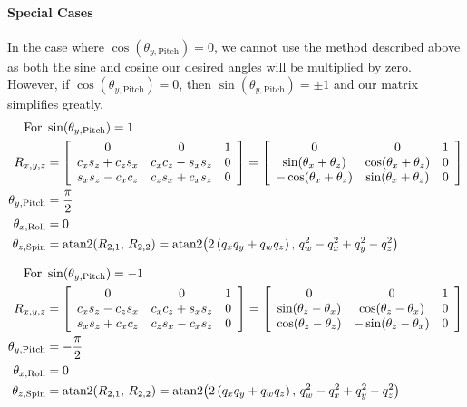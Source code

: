 \documentclass[letterpaper,10pt]{article}
\begin{document}
\paragraph{Special Cases}
In the case where $\cos\!\left(\theta_{y,\text{Pitch}}\right) = 0$, we cannot use the method described above as both the sine and cosine our desired angles will be multiplied by zero. However, if $\cos\!\left(\theta_{y,\text{Pitch}}\right) = 0$, then $\sin\!\left(\theta_{y,\text{Pitch}}\right) = \pm1$ and our matrix simplifies greatly.
\begin{align}
\nonumber \text{For } & \sin\!\left(\theta_{y,\text{Pitch}}\right) = 1 \\
R_{x,y,z} &= \left[\begin{array}{c c c} 0 & 0 & 1 \\ c_x s_z + c_z s_x & c_x c_z - s_x s_z & 0 \\ s_x s_z - c_x c_z & c_z s_x + c_x s_z & 0\end{array} \right] = \left[\begin{array}{c c c} 0 & 0 & 1 \\ \sin\!\left(\theta_x + \theta_z\right) & \cos\!\left(\theta_x + \theta_z\right) & 0 \\ -\cos\!\left(\theta_x + \theta_z\right) & \sin\!\left(\theta_x + \theta_z\right) & 0\end{array} \right] \\
\theta_{y,\text{Pitch}} &= \dfrac{\pi}{2} \\
\theta_{x,\text{Roll}} &= 0 \\
\theta_{z,\text{Spin}} &= \mathrm{atan2}\!\left(R_{2,1}, \, R_{2,2}\right) = \mathrm{atan2}\!\left(2\left(q_x q_y + q_w q_z\right), \, q_w^2 - q_x^2 + q_y^2 - q_z^2 \right)
\end{align}

\begin{align}
\nonumber \text{For } & \sin\!\left(\theta_{y,\text{Pitch}}\right) = -1 \\
R_{x,y,z} &= \left[\begin{array}{c c c} 0 & 0 & 1 \\ c_x s_z - c_z s_x & c_x c_z + s_x s_z & 0 \\ s_x s_z + c_x c_z & c_z s_x - c_x s_z & 0\end{array} \right] = \left[\begin{array}{c c c} 0 & 0 & 1 \\ \sin\!\left(\theta_z - \theta_x\right) & \cos\!\left(\theta_z - \theta_x\right) & 0\\ \cos\!\left(\theta_z - \theta_z\right) & -\sin\!\left(\theta_z - \theta_x\right) & 0\end{array} \right] \\
\theta_{y,\text{Pitch}} &= -\dfrac{\pi}{2} \\
\theta_{x,\text{Roll}} &= 0 \\
\theta_{z,\text{Spin}} &= \mathrm{atan2}\!\left(R_{2,1}, \, R_{2,2}\right) = \mathrm{atan2}\!\left(2\left(q_x q_y + q_w q_z\right), \, q_w^2 - q_x^2 + q_y^2 - q_z^2 \right) \\
\end{align}
\end{document}
